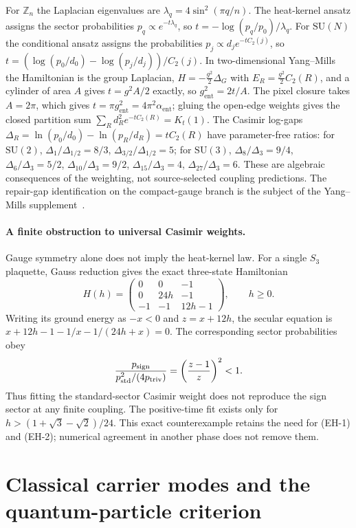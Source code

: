 \documentclass[11pt]{article}
\begin{document}
For \(\mathbb Z_n\) the Laplacian eigenvalues are \(\lambda_q=4\sin^2(\pi q/n)\).
The heat-kernel ansatz assigns the sector probabilities
\(p_q\propto e^{-t\lambda_q}\), so
\(t=-\log(p_q/p_0)/\lambda_q\). For \(\mathrm{SU}(N)\) the conditional ansatz
assigns the probabilities \(p_j\propto d_je^{-tC_2(j)}\), so
\(t=(\log(p_0/d_0)-\log(p_j/d_j))/C_2(j)\). In two-dimensional Yang--Mills the
Hamiltonian is the group Laplacian, \(H = -\frac{g^2}{2} \Delta_G\) with
\(E_R=\frac{g^2}{2}C_2(R)\), and a cylinder of area \(A\) gives
\(t=g^2A/2\) exactly, so \(g_{\mathrm{ent}}^2=2t/A\). The pixel closure takes
\(A=2\pi\), which gives \(t=\pi g_{\mathrm{ent}}^2=4\pi^2\alpha_{\mathrm{ent}}\); gluing the open-edge weights gives the closed partition
sum \(\sum_Rd_R^2e^{-tC_2(R)}=K_t(1)\). The Casimir log-gaps
\(\Delta_R=\ln(p_0/d_0)-\ln(p_R/d_R)=tC_2(R)\) have parameter-free ratios: for
\(\mathrm{SU}(2)\), \(\Delta_1/\Delta_{1/2}=8/3\), \(\Delta_{3/2}/\Delta_{1/2}=5\);
for \(\mathrm{SU}(3)\), \(\Delta_8/\Delta_3=9/4\), \(\Delta_6/\Delta_3=5/2\),
\(\Delta_{10}/\Delta_3=9/2\), \(\Delta_{15}/\Delta_3=4\), \(\Delta_{27}/\Delta_3=6\).
These are algebraic consequences of the weighting, not source-selected
coupling predictions. The repair-gap identification on the compact-gauge
branch is the subject of the Yang--Mills supplement~\cite{ophyangmills}.

\paragraph{A finite obstruction to universal Casimir weights.}
Gauge symmetry alone does not imply the heat-kernel law. For a single
$S_3$ plaquette, Gauss reduction gives the exact three-state Hamiltonian
\[
 H(h)=\begin{pmatrix}0&0&-1\\0&24h&-1\\-1&-1&12h-1\end{pmatrix},
 \qquad h\geq0.
\]
Writing its ground energy as $-x<0$ and $z=x+12h$, the secular equation is
$x+12h-1-1/x-1/(24h+x)=0$. The corresponding sector probabilities obey
\[
 \frac{p_{\rm sign}}{p_{\rm std}^2/(4p_{\rm triv})}
 =\left(\frac{z-1}{z}\right)^2<1.
\]
Thus fitting the standard-sector Casimir weight does not reproduce the sign
sector at any finite coupling. The positive-time fit exists only for
$h>(1+\sqrt3-\sqrt2)/24$. This exact counterexample retains the need for
(EH-1) and (EH-2); numerical agreement in another phase does not remove them.

\section{Classical carrier modes and the quantum-particle criterion}
\label{sec:particle-criterion}
\end{document}
